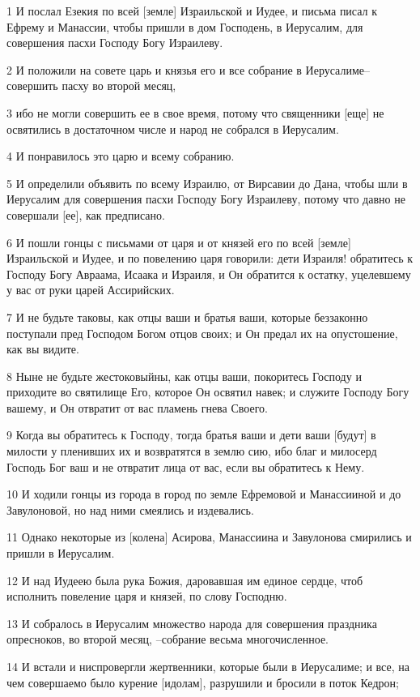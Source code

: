 \par 1 И послал Езекия по всей [земле] Израильской и Иудее, и письма писал к Ефрему и Манассии, чтобы пришли в дом Господень, в Иерусалим, для совершения пасхи Господу Богу Израилеву.
\par 2 И положили на совете царь и князья его и все собрание в Иерусалиме--совершить пасху во второй месяц,
\par 3 ибо не могли совершить ее в свое время, потому что священники [еще] не освятились в достаточном числе и народ не собрался в Иерусалим.
\par 4 И понравилось это царю и всему собранию.
\par 5 И определили объявить по всему Израилю, от Вирсавии до Дана, чтобы шли в Иерусалим для совершения пасхи Господу Богу Израилеву, потому что давно не совершали [ее], как предписано.
\par 6 И пошли гонцы с письмами от царя и от князей его по всей [земле] Израильской и Иудее, и по повелению царя говорили: дети Израиля! обратитесь к Господу Богу Авраама, Исаака и Израиля, и Он обратится к остатку, уцелевшему у вас от руки царей Ассирийских.
\par 7 И не будьте таковы, как отцы ваши и братья ваши, которые беззаконно поступали пред Господом Богом отцов своих; и Он предал их на опустошение, как вы видите.
\par 8 Ныне не будьте жестоковыйны, как отцы ваши, покоритесь Господу и приходите во святилище Его, которое Он освятил навек; и служите Господу Богу вашему, и Он отвратит от вас пламень гнева Своего.
\par 9 Когда вы обратитесь к Господу, тогда братья ваши и дети ваши [будут] в милости у пленивших их и возвратятся в землю сию, ибо благ и милосерд Господь Бог ваш и не отвратит лица от вас, если вы обратитесь к Нему.
\par 10 И ходили гонцы из города в город по земле Ефремовой и Манассииной и до Завулоновой, но над ними смеялись и издевались.
\par 11 Однако некоторые из [колена] Асирова, Манассиина и Завулонова смирились и пришли в Иерусалим.
\par 12 И над Иудеею была рука Божия, даровавшая им единое сердце, чтоб исполнить повеление царя и князей, по слову Господню.
\par 13 И собралось в Иерусалим множество народа для совершения праздника опресноков, во второй месяц, --собрание весьма многочисленное.
\par 14 И встали и ниспровергли жертвенники, которые были в Иерусалиме; и все, на чем совершаемо было курение [идолам], разрушили и бросили в поток Кедрон;
